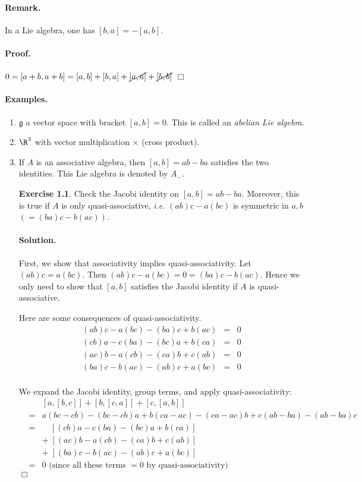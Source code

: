 \documentclass[11pt]{article}
\newcommand{\g}{\mathfrak{g}}
\newcommand{\sk}{\vspace*{1em}}
\begin{document}
\paragraph{Remark.} In a Lie algebra, one has $[b, a] = -[a,b]$.

\paragraph{Proof.} $0 = [a+b, a+b] = [a, b] + [b, a] + \cancel{[a, a]} + \cancel{[b, b]}$ \hfill $\Box$  

\paragraph{Examples.}
\begin{enumerate}
\item $\g$ a vector space with bracket $[a,b] = 0$.  This is called an 
\emph{abelian Lie algebra}.
\item $\R^3$ with vector multiplication $\times$ (cross product).
\item If $A$ is an associative algebra, then $[a,b] = ab - ba$ satisfies the
two identities.  This Lie algebra is denoted by $A_-$.

\sk\noindent
{\bf Exercise 1.1}.  Check the Jacobi identity on $[a, b] = ab-ba$.  Moreover, this is
true if $A$ is only quasi-associative, \emph{i.e.} $(ab)c-a(bc)$ is symmetric in $a, b$ $(= (ba)c-b(ac))$.

\paragraph{Solution.} First, we show that associativity implies quasi-associativity.
Let $(ab)c = a(bc)$.  Then $(ab)c - a(bc) = 0 = (ba)c - b(ac)$.
Hence we only need to show that $[a,b]$ satisfies the Jacobi
identity if $A$ is quasi-associative.

Here are some consequences of quasi-associativity.
\begin{eqnarray*}
(ab)c-a(bc)-(ba)c+b(ac) &=& 0 \\
(cb)a-c(ba)-(bc)a+b(ca) &=& 0 \\
(ac)b-a(cb)-(ca)b+c(ab) &=& 0 \\
(ba)c-b(ac)-(ab)c+a(bc) &=& 0 \\
\end{eqnarray*}

We expand the Jacobi identity, group terms, and apply
quasi-associativity:
\begin{eqnarray*}
&& [a, [b, c]] + [b, [c, a]] + [c, [a, b]] \\
&=& a(bc-cb) - (bc-cb)a + b(ca-ac) - (ca-ac)b + c(ab-ba) - (ab-ba)c\\
&=& \quad [(cb)a-c(ba)-(bc)a+b(ca)] \\
&& +\; [(ac)b-a(cb)-(ca)b+c(ab)] \\
&& +\; [(ba)c-b(ac)-(ab)c+a(bc)]\\
&=& 0 \mbox{ (since all these terms $= 0$ by quasi-associativity)}
\end{eqnarray*}
$\Box$


\end{enumerate}
\end{document}
